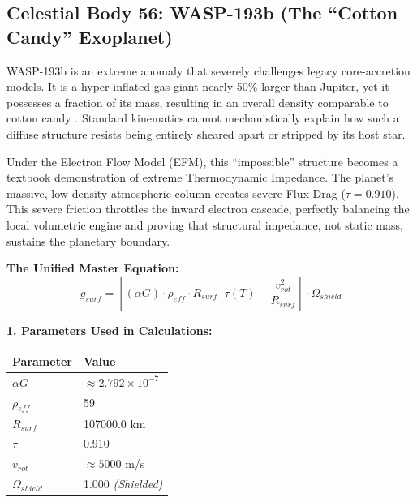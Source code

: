 \documentclass[11pt, a4paper]{article}
\begin{document}
\clearpage
\subsection{Celestial Body 56: WASP-193b (The ``Cotton Candy'' Exoplanet)}
  WASP-193b is an extreme anomaly that severely challenges legacy core-accretion models. It is a hyper-inflated gas giant nearly 50\% larger than Jupiter, yet it possesses a fraction of its mass, resulting in an overall density comparable to cotton candy \cite{barkaoui2024}. Standard kinematics cannot mechanistically explain how such a diffuse structure resists being entirely sheared apart or stripped by its host star. 

  Under the Electron Flow Model (EFM), this ``impossible'' structure becomes a textbook demonstration of extreme Thermodynamic Impedance. The planet's massive, low-density atmospheric column creates severe Flux Drag ($\tau = 0.910$). This severe friction throttles the inward electron cascade, perfectly balancing the local volumetric engine and proving that structural impedance, not static mass, sustains the planetary boundary.

  \vspace{0.5em}
  \noindent \textbf{The Unified Master Equation:}
  $$ g_{surf} = \left[ (\alpha G) \cdot \rho_{eff} \cdot R_{surf} \cdot \tau(T) - \frac{v_{rot}^2}{R_{surf}} \right] \cdot \Omega_{shield} $$

  \vspace{0.5em}
  \noindent \textbf{1. Parameters Used in Calculations:} \\[0.5em]
  \begingroup
  \renewcommand{\arraystretch}{1.3}
  \hspace*{2em}
  \begin{tabular}{|l|l|}
    \hline
    \textbf{Parameter} & \textbf{Value} \\ \hline
    $\alpha G$ & $\approx 2.792 \times 10^{-7}$ \\ \hline
    $\rho_{eff}$ & 59 \\ \hline
    $R_{surf}$ & 107000.0 km \\ \hline
    $\tau$ & 0.910 \\ \hline
    $v_{rot}$ & $\approx 5000$ m/s \\ \hline
    $\Omega_{shield}$ & 1.000 \textit{(Shielded)} \\ \hline
  \end{tabular}
  \endgroup
\end{document}
